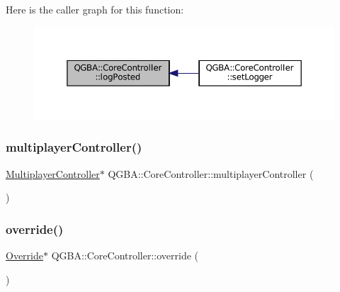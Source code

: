 Here is the caller graph for this function\+:
\nopagebreak
\begin{figure}[H]
\begin{center}
\leavevmode
\includegraphics[width=350pt]{class_q_g_b_a_1_1_core_controller_a7fd83cd7f60584e9071da1fd9043c0f6_icgraph}
\end{center}
\end{figure}
\mbox{\label{class_q_g_b_a_1_1_core_controller_a991487e88ca6ac023475ed74d2fdc820}} 
\subsubsection{\texorpdfstring{multiplayer\+Controller()}{multiplayerController()}}
{\footnotesize\ttfamily \mbox{\hyperlink{class_q_g_b_a_1_1_multiplayer_controller}{Multiplayer\+Controller}}$\ast$ Q\+G\+B\+A\+::\+Core\+Controller\+::multiplayer\+Controller (\begin{DoxyParamCaption}{ }\end{DoxyParamCaption})\hspace{0.3cm}{\ttfamily [inline]}}

\mbox{\label{class_q_g_b_a_1_1_core_controller_acb949cb410a97707fceab00d39281cc4}} 
\subsubsection{\texorpdfstring{override()}{override()}}
{\footnotesize\ttfamily \mbox{\hyperlink{class_q_g_b_a_1_1_override}{Override}}$\ast$ Q\+G\+B\+A\+::\+Core\+Controller\+::override (\begin{DoxyParamCaption}{ }\end{DoxyParamCaption})\hspace{0.3cm}{\ttfamily [inline]}}

